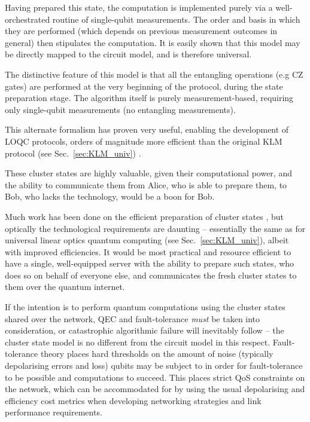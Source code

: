 \documentclass[aps,rmp,twocolumn,amsmath,amssymb,nofootinbib,superscriptaddress]{revtex4}
\begin{document}
Having prepared this state, the computation is implemented purely via a well-orchestrated routine of single-qubit measurements. The order and basis in which they are performed (which depends on previous measurement outcomes in general) then stipulates the computation. It is easily shown that this model may be directly mapped to the circuit model, and is therefore universal.

The distinctive feature of this model is that all the entangling operations (e.g CZ gates) are performed at the very beginning of the protocol, during the state preparation stage. The algorithm itself is purely measurement-based, requiring only single-qubit measurements (no entangling measurements).

This alternate formalism has proven very useful, enabling the development of LOQC protocols, orders of magnitude more efficient than the original KLM protocol (see Sec.~\ref{sec:KLM_univ}) \cite{???}.

These cluster states are highly valuable, given their computational power, and the ability to communicate them from Alice, who is able to prepare them, to Bob, who lacks the technology, would be a boon for Bob.

Much work has been done on the efficient preparation of cluster states \cite{bib:BarrettKok05, bib:BenjaminEisert05, bib:Gross06, bib:RohdeStratCS07}, but optically the technological requirements are daunting -- essentially the same as for universal linear optics quantum computing (see Sec.~\ref{sec:KLM_univ}), albeit with improved efficiencies. It would be most practical and resource efficient to have a single, well-equipped server with the ability to prepare such states, who does so on behalf of everyone else, and communicates the fresh cluster states to them over the quantum internet.

If the intention is to perform quantum computations using the cluster states shared over the network, QEC and fault-tolerance \emph{must} be taken into consideration, or catastrophic algorithmic failure will inevitably follow -- the cluster state model is no different from the circuit model in this respect. Fault-tolerance theory places hard thresholds on the amount of noise (typically depolarising errors and loss) qubits may be subject to in order for fault-tolerance to be possible and computations to succeed. This places strict QoS constraints on the network, which can be accommodated for by using the usual depolarising and efficiency cost metrics when developing networking strategies and link performance requirements.
\end{document}

